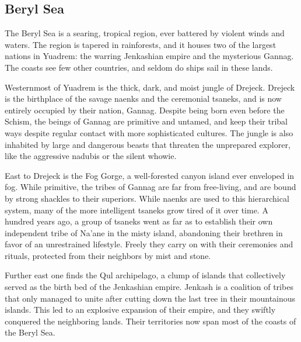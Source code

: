 \subsection*{Beryl Sea} \label{ssec::berylsea}

The Beryl Sea is a searing, tropical region, ever battered by violent winds and waters.
The region is tapered in rainforests, and it houses two of the largest nations in Yuadrem: the warring Jenkashian empire and the mysterious Gannag.
The coasts see few other countries, and seldom do ships sail in these lands.

Westernmost of Yuadrem is the thick, dark, and moist jungle of Drejeck.
Drejeck is the birthplace of the savage naenks and the ceremonial tsaneks, and is now entirely occupied by their nation, Gannag.
Despite being born even before the Schism, the beings of Gannag are primitive and untamed, and keep their tribal ways despite regular contact with more sophisticated cultures.
The jungle is also inhabited by large and dangerous beasts that threaten the unprepared explorer, like the aggressive nadubis or the silent whowie.

East to Drejeck is the Fog Gorge, a well-forested canyon island ever enveloped in fog.
While primitive, the tribes of Gannag are far from free-living, and are bound by strong shackles to their superiors.
While naenks are used to this hierarchical system, many of the more intelligent tsaneks grow tired of it over time.
A hundred years ago, a group of tsaneks went as far as to establish their own independent tribe of Na'ane in the misty island, abandoning their brethren in favor of an unrestrained lifestyle.
Freely they carry on with their ceremonies and rituals, protected from their neighbors by mist and stone.

Further east one finds the Qul archipelago, a clump of islands that collectively served as the birth bed of the Jenkashian empire.
Jenkash is a coalition of tribes that only managed to unite after cutting down the last tree in their mountainous islands.
This led to an explosive expansion of their empire, and they swiftly conquered the neighboring lands.
Their territories now span most of the coasts of the Beryl Sea.

